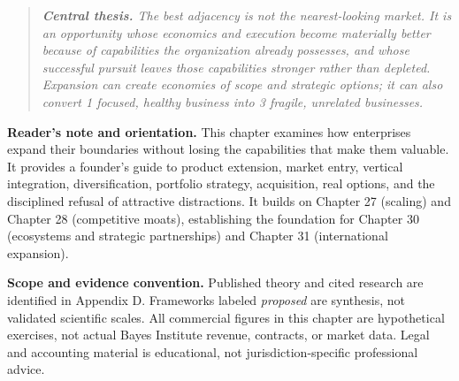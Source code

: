 
\begin{quote}
\textit{\textbf{Central thesis.} The best adjacency is not the nearest-looking market. It is an opportunity whose economics and execution become materially better because of capabilities the organization already possesses, and whose successful pursuit leaves those capabilities stronger rather than depleted. Expansion can create economies of scope and strategic options; it can also convert 1 focused, healthy business into 3 fragile, unrelated businesses.}
\end{quote}

\noindent\textbf{Reader's note and orientation.} This chapter examines how enterprises expand their boundaries without losing the capabilities that make them valuable. It provides a founder's guide to product extension, market entry, vertical integration, diversification, portfolio strategy, acquisition, real options, and the disciplined refusal of attractive distractions. It builds on Chapter 27 (scaling) and Chapter 28 (competitive moats), establishing the foundation for Chapter 30 (ecosystems and strategic partnerships) and Chapter 31 (international expansion).

\vspace{0.5em}
\noindent\textbf{Scope and evidence convention.} Published theory and cited research are identified in Appendix D. Frameworks labeled \textit{proposed} are synthesis, not validated scientific scales. All commercial figures in this chapter are hypothetical exercises, not actual Bayes Institute revenue, contracts, or market data. Legal and accounting material is educational, not jurisdiction-specific professional advice.

